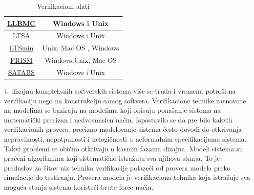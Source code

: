 \documentclass[a4paper]{article}
\begin{document}
{\begin{table}
\begin{center}
\begin{tabular}{||c c ||}
   \hline
 \href{http://llbmc.org/} {LLBMC} & Windows i Unix \\ 
    \hline
 \href{http://www.doc.ic.ac.uk/~jnm/book/} {LTSA} & Windows i Unix \\ 
     \hline
 \href{http://fmt.cs.utwente.nl/tools/ltsmin/} {LTSmin} & Unix, Mac OS , Windows \\
    \hline
 \href{https://en.wikipedia.org/wiki/PRISM_model_checker} {PRISM} &  Windows,Unix, Mac OS \\
   \hline
 \href{http://www.cprover.org/satabs/} {SATABS} &  Windows i Unix \\ [1ex]
 \hline
\end{tabular}
\caption{Verifikacioni alati \cite{wikiwebsite}}
\end {center}
\end {table}


\newpage


	U dizajnu kompleksnih softverskih sistema više se truda i vremena potroši na
	verifikaciju nego na konstrukciju samog softvera. Verifikacione tehnike  zasnovane na modelima se baziraju na modelima koji opisuju ponašanje sistema na matematički precizan i nedvosmislen način. Ispostavilo se da pre bilo kakvih verifikacionih provera, precizno modelovanje sistema često dovodi do otkrivanja nepravilnosti, nepotpunosti i nelogičnosti u neformalnim specifikacijama sistema. Takvi problemi se obično otkrivaju u kasnim fazama dizajna. Modeli sistema su praćeni algoritmima koji sistematično istražuju sva njihova stanja. To je preduslov za čitav niz tehnika verifikacije polazeći od provera modela preko simulacije do testiranja.
	Provera modela je verifikaciona tehnika koja istražuje sva moguća stanja sistema koristeći brute-force način.
	\newline

}
\end{document}

